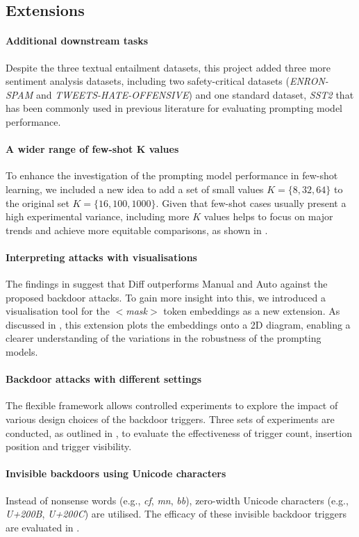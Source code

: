 \subsection{Extensions}
\vspace{-0.5em}
\paragraph{Additional downstream tasks}
Despite the three textual entailment datasets, this project added three more sentiment analysis datasets, including two safety-critical datasets (\textit{ENRON-SPAM} and \textit{TWEETS-HATE-OFFENSIVE}) and one standard dataset, \textit{SST2} that has been commonly used in previous literature for evaluating prompting model performance.
\vspace{-1.0em}
 \paragraph{A wider range of few-shot K values}
To enhance the investigation of the prompting model performance in few-shot learning, we included a new idea to add a set of small values $K = \{8, 32, 64\}$ to the original set $K = \{16, 100, 1000\}$. Given that few-shot cases usually present a high experimental variance, including more $K$ values helps to focus on major trends and achieve more equitable comparisons, as shown in .
\vspace{-1.0em}
 \paragraph{Interpreting attacks with visualisations}
The findings in  suggest that Diff outperforms Manual and Auto against the proposed backdoor attacks. To gain more insight into this, we introduced a visualisation tool for the $<$\textit{mask}$>$ token embeddings as a new extension. As discussed in , this extension plots the embeddings onto a 2D diagram, enabling a clearer understanding of the variations in the robustness of the prompting models.
\vspace{-1.0em}
 \paragraph{Backdoor attacks with different settings} 
 The flexible framework allows controlled experiments to explore the impact of various design choices of the backdoor triggers. Three sets of experiments are conducted, as outlined in , to evaluate the effectiveness of trigger count, insertion position and trigger visibility.
\vspace{-1.0em}
 \paragraph{Invisible backdoors using Unicode characters}
 Instead of nonsense words (e.g., \textit{cf}, \textit{mn}, \textit{bb}), zero-width Unicode characters (e.g., \textit{U+200B}, \textit{U+200C}) are utilised. The efficacy of these invisible backdoor triggers are evaluated in .